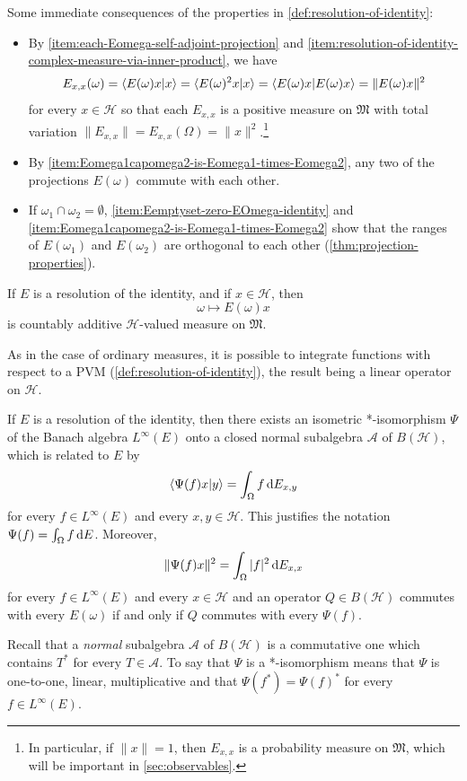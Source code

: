 Some immediate consequences of the properties in \autoref{def:resolution-of-identity}:
\begin{itemize}
\item 
  By \ref{item:each-Eomega-self-adjoint-projection} and \ref{item:resolution-of-identity-complex-measure-via-inner-product}, we have
  \begin{equation}\label{eq:Exx-positive-measure}
  E_{x,x}(\omega) 
  = 
  \braket{E(\omega)x | x} 
  =
  \braket{E(\omega)^2 x | x}
  =
  \braket{E(\omega) x | E(\omega) x}
  =
  \|E(\omega)x\|^2
  \end{equation}
  for every $x \in \mathcal{H}$ so that each $E_{x,x}$ is a positive measure on $\mathfrak{M}$ with total variation $\|E_{x,x}\| = E_{x,x}(\Omega) = \|x\|^2$.\footnote{In particular, if $\|x\| = 1$, then $E_{x,x}$ is a probability measure on $\mathfrak{M}$, which will be important in \autoref{sec:observables}.}
\item 
  By \ref{item:Eomega1capomega2-is-Eomega1-times-Eomega2}, any two of the projections $E(\omega)$ commute with each other.
\item 
  If $\omega_1 \cap \omega_2 = \emptyset$, \ref{item:Eemptyset-zero-EOmega-identity} and \ref{item:Eomega1capomega2-is-Eomega1-times-Eomega2} show that the ranges of $E(\omega_1)$ and $E(\omega_2)$ are orthogonal to each other (\autoref{thm:projection-properties}).
\end{itemize}


\begin{proposition}
If $E$ is a resolution of the identity, and if $x \in \mathcal{H}$, then
\[
\omega \mapsto E(\omega)x
\]
is countably additive $\mathcal{H}$-valued measure on $\mathfrak{M}$.
\end{proposition}


As in the case of ordinary measures, it is possible to integrate functions with respect to a PVM (\autoref{def:resolution-of-identity}), the result being a linear operator on $\mathcal{H}$.

\begin{theorem}\label{thm:integration-projection-valued-measure}
If $E$ is a resolution of the identity, then there exists an isometric *-isomorphism 
$
\Psi
$
of the Banach algebra $L^\infty(E)$ onto a closed normal subalgebra $\mathcal{A}$ of $B(\mathcal{H})$, which is related to $E$ by
\[
\braket{\Psi(f)x | y} = \int_\Omega f \,\mathrm{d} E_{x,y}
\]
for every $f \in L^\infty(E)$ and every $x,y \in \mathcal{H}$.
This justifies the notation $\Psi(f) = \int_\Omega f \,\mathrm{d} E$.
Moreover,
\[
\|\Psi(f)x\|^2 = \int_\Omega |f|^2 \,\mathrm{d} E_{x,x}
\]
for every $f \in L^\infty(E)$ and every $x \in \mathcal{H}$
and
an operator $Q \in B(\mathcal{H})$ commutes with every $E(\omega)$ if and only if $Q$ commutes with every $\Psi(f)$.

Recall that a \emph{normal} subalgebra $\mathcal{A}$ of $B(\mathcal{H})$ is a commutative one which contains $T^*$ for every $T \in \mathcal{A}$.
To say that $\Psi$ is a *-isomorphism means that $\Psi$ is one-to-one, linear, multiplicative and that $\Psi(f^*) = \Psi(f)^*$ for every $f \in L^\infty(E)$.
\end{theorem}


